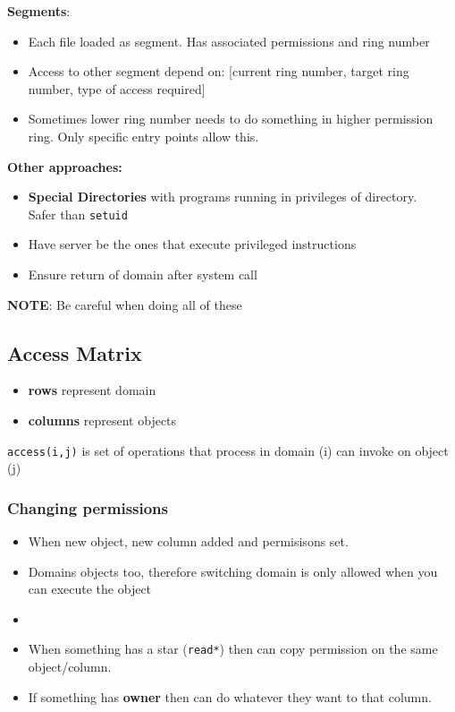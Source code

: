 \documentclass{article}
\begin{document}
		\textbf{Segments}:
		\begin{itemize}
			\item Each file loaded as segment. Has associated permissions and ring number
			\item Access to other segment depend on: [current ring number, target ring number, type of access required]
			\item Sometimes lower ring number needs to do something in higher permission ring. Only specific entry points allow this.
		\end{itemize}
		
		\textbf{Other approaches:}
		\begin{itemize}
			\item \textbf{Special Directories} with programs running in privileges of directory. \\Safer than \texttt{setuid}
			\item Have server be the ones that execute privileged instructions
			\item Ensure return of domain after system call
		\end{itemize}
		\textbf{NOTE}: Be careful when doing all of these
		
	\subsection{Access Matrix}
		\begin{itemize}
			\item \textbf{rows} represent domain
			\item \textbf{columns} represent objects
		\end{itemize}
		
		\texttt{access(i,j)} is set of operations that process in domain (i) can invoke on object (j)
		
		\subsubsection{Changing permissions}
			\begin{itemize}
				\item When new object, new column added and permisisons set.
				\item Domains objects too, therefore switching domain is only allowed when you can execute the object
				\item 
				\item When something has a star (\texttt{read*}) then can copy permission on the same object/column. 
				\item If something has \textbf{owner} then can do whatever they want to that column.
			\end{itemize}
			
\end{document}
